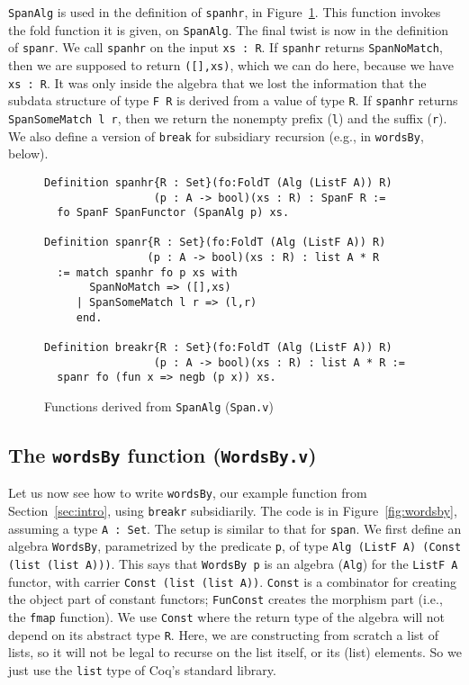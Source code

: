 \documentclass[a4paper,USenglish]{lipics-v2021}
\begin{document}
\verb|SpanAlg| is used in the definition of \verb|spanhr|, in
Figure~\ref{fig:span}.  This function invokes the fold function it is
given, on \verb|SpanAlg|.  The final twist is now in the definition of
\verb|spanr|.  We call \verb|spanhr| on the input \verb|xs : R|.  If
\verb|spanhr| returns \verb|SpanNoMatch|, then we are supposed to
return \verb|([],xs)|, which we can do here, because we have
\verb|xs : R|.  It was only inside the algebra that we lost the
information that the subdata structure of type \verb|F R| is derived
from a value of type \verb|R|.  If \verb|spanhr| returns
\verb|SpanSomeMatch l r|, then we return the nonempty
prefix (\verb|l|) and the suffix (\verb|r|).  We also define a version of \verb|break| 
for subsidiary recursion (e.g., in \verb|wordsBy|, below).


\begin{figure}
\begin{verbatim}
Definition spanhr{R : Set}(fo:FoldT (Alg (ListF A)) R)
                 (p : A -> bool)(xs : R) : SpanF R :=
  fo SpanF SpanFunctor (SpanAlg p) xs.

Definition spanr{R : Set}(fo:FoldT (Alg (ListF A)) R)
                (p : A -> bool)(xs : R) : list A * R
  := match spanhr fo p xs with
       SpanNoMatch => ([],xs)
     | SpanSomeMatch l r => (l,r)
     end.

Definition breakr{R : Set}(fo:FoldT (Alg (ListF A)) R)
                 (p : A -> bool)(xs : R) : list A * R :=
  spanr fo (fun x => negb (p x)) xs.
\end{verbatim}
\caption{Functions derived from \texttt{SpanAlg} (\texttt{Span.v})}
\label{fig:span}
\end{figure}


\subsection{The \texttt{wordsBy} function (\texttt{WordsBy.v})}

Let us now see how to write \verb|wordsBy|, our example function from
Section~\ref{sec:intro}, using \verb|breakr| subsidiarily.  The code
is in Figure~\ref{fig:wordsby}, assuming a type \verb|A : Set|.  The
setup is similar to that for \verb|span|.  We first define an algebra
\verb|WordsBy|, parametrized by the predicate \verb|p|, of type
\verb|Alg (ListF A) (Const (list (list A)))|.  This says that
\verb|WordsBy p| is an algebra (\verb|Alg|) for the \verb|ListF A|
functor, with carrier \verb|Const (list (list A))|.  \verb|Const| is
a combinator for creating the object part of constant functors;
\verb|FunConst| creates the morphism part (i.e., the \verb|fmap|
function).  We use \verb|Const| where the return type of the algebra
will not depend on its abstract type \verb|R|.  Here, we are
constructing from scratch a list of lists, so it will not be legal to
recurse on the list itself, or its (list) elements.  So we just use
the \verb|list| type of Coq's standard library.
\end{document}
